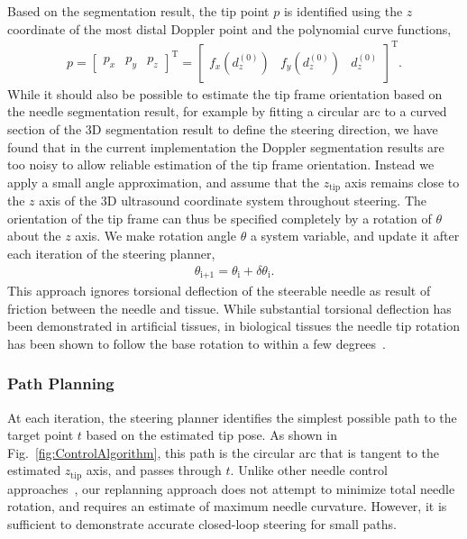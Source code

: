 Based on the segmentation result, the tip point ${p}$ is identified using the $z$ coordinate of the most distal Doppler point and the polynomial curve functions,
\begin{align}
{p} = \begin{bmatrix}p_x & p_y & p_z\end{bmatrix}^{\text{T}} = \begin{bmatrix}f_x(d^{(0)}_z) & f_y(d^{(0)}_z) & d^{(0)}_z \end{bmatrix}^{\text{T}}.
\end{align}
While it should also be possible to estimate the tip frame orientation based on the needle segmentation result, for example by fitting a circular arc to a curved section of the 3D segmentation result to define the steering direction, we have found that in the current implementation the Doppler segmentation results are too noisy to allow reliable estimation of the tip frame orientation. Instead we apply a small angle approximation, and assume that the $z_{\text{tip}}$ axis remains close to the $z$ axis of the 3D ultrasound coordinate system throughout steering. The orientation of the tip frame can thus be specified completely by a rotation of $\theta$ about the $z$ axis. We make rotation angle $\theta$ a system variable, and update it after each iteration of the steering planner, 
\begin{align}
\theta_\text{i+1} = \theta_\text{i} + \delta\theta_\text{i}.
\end{align}
This approach ignores torsional deflection of the steerable needle as result of friction between the needle and tissue. While substantial torsional deflection has been demonstrated in artificial tissues, in biological tissues the needle tip rotation has been shown to follow the base rotation to within a few degrees~\cite{Reed2008}. 

\subsubsection{Path Planning}
At each iteration, the steering planner identifies the simplest possible path to the target point ${t}$ based on the estimated tip pose. As shown in Fig.~\ref{fig:ControlAlgorithm}, this path is the circular arc that is tangent to the estimated $z_{\text{tip}}$ axis, and passes through ${t}$. Unlike other needle control approaches~\cite{Abayazid2014,Rucker2013}, our replanning approach does not attempt to minimize total needle rotation, and requires an estimate of maximum needle curvature. However, it is sufficient to demonstrate accurate closed-loop steering for small paths. 

